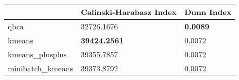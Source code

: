 \begin{table}[htbp]
\centering
\begin{tabular}{lll}
\toprule
 & Calinski-Harabasz Index & Dunn Index \\
\midrule
qbca & 32726.1676 & \textbf{0.0089} \\
kmeans & \textbf{39424.2561} & 0.0072 \\
kmeans_plusplus & 39355.7857 & 0.0072 \\
minibatch_kmeans & 39373.8792 & 0.0072 \\
\bottomrule
\end{tabular}
\end{table}
